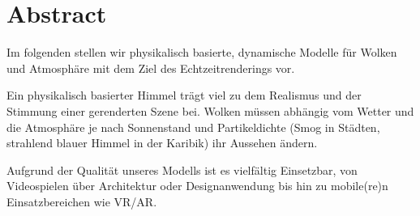 \section*{Abstract}
\label{sec:abstract}

Im folgenden stellen wir physikalisch basierte, dynamische Modelle für Wolken und Atmosphäre mit dem Ziel des
Echtzeitrenderings vor.

Ein physikalisch basierter Himmel trägt viel zu dem Realismus und der Stimmung einer gerenderten Szene bei. Wolken
müssen abhängig vom Wetter und die Atmosphäre je nach Sonnenstand und Partikeldichte (Smog in Städten, strahlend
blauer Himmel in der Karibik) ihr Aussehen ändern.

Aufgrund der Qualität unseres Modells ist es vielfältig Einsetzbar, von Videospielen über Architektur oder
Designanwendung bis hin zu mobile(re)n Einsatzbereichen wie VR/AR.
